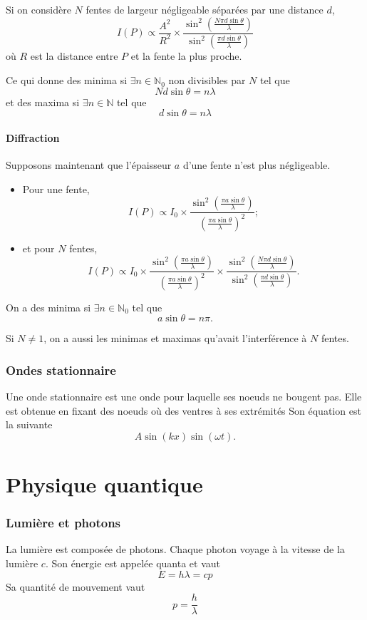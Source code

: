 Si on considère $N$ fentes de largeur négligeable séparées par une
distance $d$,
\[ I(P) \propto \frac{A^2}{R^2} \times
  \frac{\sin^2\left(\frac{N \pi d \sin\theta}{\lambda}\right)}
{\sin^2\left(\frac{\pi d \sin\theta}{\lambda}\right)} \]
où $R$ est la distance entre $P$ et la fente la plus proche.

Ce qui donne des minima si
$\exists n \in \mathbb{N}_0$ non divisibles par $N$ tel que
\[ N d \sin \theta = n \lambda \]
et des maxima si $\exists n \in \mathbb{N}$ tel que
\[ d \sin \theta = n \lambda \]

\subsection{Diffraction}
Supposons maintenant que l'épaisseur $a$ d'une fente n'est plus
négligeable.
\begin{itemize}
  \item Pour une fente,
    \[ I(P) \propto I_0 \times
      \frac{\sin^2\left(\frac{\pi a \sin\theta}{\lambda}\right)}
    {\left(\frac{\pi a \sin\theta}{\lambda}\right)^2}; \]
  \item et pour $N$ fentes,
    \[ I(P) \propto I_0 \times
      \frac{\sin^2\left(\frac{\pi a \sin\theta}{\lambda}\right)}
      {\left(\frac{\pi a \sin\theta}{\lambda}\right)^2} \times
      \frac{\sin^2\left(\frac{N \pi d \sin\theta}{\lambda}\right)}
    {\sin^2\left(\frac{\pi d \sin\theta}{\lambda}\right)}. \]
\end{itemize}
On a des minima si $\exists n \in \mathbb{N}_0$ tel que
\[ a \sin \theta = n\pi. \]

Si $N \neq 1$, on a aussi les minimas et maximas qu'avait
l'interférence à $N$ fentes.

\section{Ondes stationnaire}
Une onde stationnaire est une onde pour laquelle ses noeuds ne bougent pas.
Elle est obtenue en fixant des noeuds où des ventres à ses extrémités
Son équation est la suivante
\[ A \sin(kx) \sin(\omega t). \]

\part{Physique quantique}
\section{Lumière et photons}
La lumière est composée de photons.
Chaque photon voyage à la vitesse de la lumière $c$.
Son énergie est appelée quanta et vaut
\[ E = h\lambda = cp \]
Sa quantité de mouvement vaut
\[ p = \frac{h}{\lambda} \]

